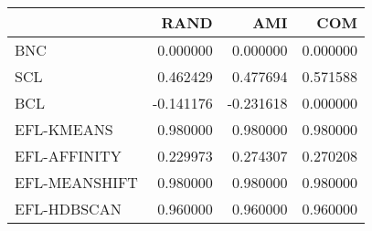\begin{tabular}{lrrr}
\toprule
 & RAND & AMI & COM \\
\midrule
BNC & 0.000000 & 0.000000 & 0.000000 \\
SCL & 0.462429 & 0.477694 & 0.571588 \\
BCL & -0.141176 & -0.231618 & 0.000000 \\
EFL-KMEANS & 0.980000 & 0.980000 & 0.980000 \\
EFL-AFFINITY & 0.229973 & 0.274307 & 0.270208 \\
EFL-MEANSHIFT & 0.980000 & 0.980000 & 0.980000 \\
EFL-HDBSCAN & 0.960000 & 0.960000 & 0.960000 \\
\bottomrule
\end{tabular}
